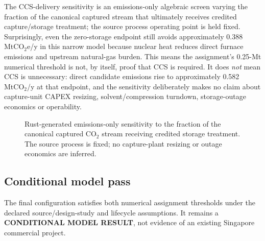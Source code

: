 The CCS-delivery sensitivity is an emissions-only algebraic screen varying the fraction of the canonical captured stream that ultimately receives credited capture/storage treatment; the source process operating point is held fixed.  Surprisingly, even the zero-storage endpoint still avoids approximately 0.388 MtCO$_2$e/y in this narrow model because nuclear heat reduces direct furnace emissions and upstream natural-gas burden.  This means the assignment's 0.25-Mt numerical threshold is not, by itself, proof that CCS is required.  It does \emph{not} mean CCS is unnecessary: direct candidate emissions rise to approximately 0.582 MtCO$_2$/y at that endpoint, and the sensitivity deliberately makes no claim about capture-unit CAPEX resizing, solvent/compression turndown, storage-outage economics or operability.

\begin{figure}[htbp]\centering

\caption{Rust-generated emissions-only sensitivity to the fraction of the canonical captured CO$_2$ stream receiving credited storage treatment.  The source process is fixed; no capture-plant resizing or outage economics are inferred.}
\label{fig:ccs-robustness}
\end{figure}

\subsection{Conditional model pass}
The final configuration satisfies both numerical assignment thresholds under the declared source/design-study and lifecycle assumptions. It remains a \textbf{CONDITIONAL MODEL RESULT}, not evidence of an existing Singapore commercial project.

